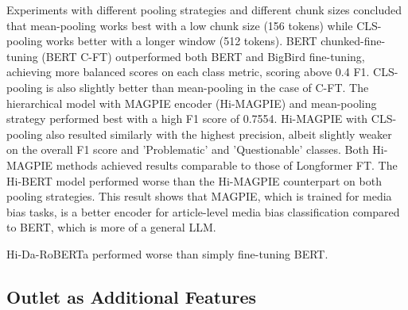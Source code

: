 Experiments with different pooling strategies and different chunk sizes concluded that mean-pooling works best with a low chunk size (156 tokens) while CLS-pooling works better with a longer window (512 tokens). BERT chunked-fine-tuning (BERT C-FT) outperformed both BERT and BigBird fine-tuning, achieving more balanced scores on each class metric, scoring above 0.4 F1. CLS-pooling is also slightly better than mean-pooling in the case of C-FT. The hierarchical model with MAGPIE encoder (Hi-MAGPIE) and mean-pooling strategy performed best with a high F1 score of 0.7554. Hi-MAGPIE with CLS-pooling also resulted similarly with the highest precision, albeit slightly weaker on the overall F1 score and 'Problematic' and 'Questionable' classes. Both Hi-MAGPIE methods achieved results comparable to those of Longformer FT. The Hi-BERT model performed worse than the Hi-MAGPIE counterpart on both pooling strategies. This result shows that MAGPIE, which is trained for media bias tasks, is a better encoder for article-level media bias classification compared to BERT, which is more of a general LLM.

Hi-Da-RoBERTa performed worse than simply fine-tuning BERT.

\subsection{Outlet as Additional Features}

